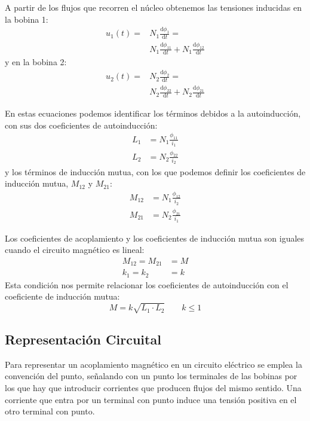 A partir de los flujos que recorren el núcleo obtenemos las tensiones inducidas en la bobina 1:
\begin{align*}
  u_1(t) = &N_1 \frac{\mathrm{d}\phi_1}{\mathrm{d}t} = \\
  &N_1 \frac{\mathrm{d}\phi_{11}}{\mathrm{d}t} + N_1 \frac{\mathrm{d}\phi_{12}}{\mathrm{d}t}
\end{align*}
y en la bobina 2:
\begin{align*}
  u_2(t) = &N_2 \frac{\mathrm{d}\phi_2}{\mathrm{d}t} = \\
  &N_2 \frac{\mathrm{d}\phi_{22}}{\mathrm{d}t} + N_2 \frac{\mathrm{d}\phi_{21}}{\mathrm{d}t}
\end{align*}

En estas ecuaciones podemos identificar los términos debidos a la autoinducción, con sus dos coeficientes de autoinducción:
\begin{align}
  \label{eq:acoplamiento-autoinduccion}
  L_1 &= N_1 \frac{\phi_{11}}{i_1}\\
  L_2 &= N_2 \frac{\phi_{22}}{i_2}
\end{align}
y los términos de inducción mutua, con los que podemos definir los coeficientes de inducción mutua, $M_{12}$ y $M_{21}$:
\begin{align}
  \label{eq:coef-induccion-mutua}
  M_{12} &= N_1 \frac{\phi_{12}}{i_2}\\
  M_{21} &= N_2 \frac{\phi_{21}}{i_1}
\end{align}

Los coeficientes de acoplamiento y los coeficientes de inducción mutua son iguales cuando el circuito magnético es lineal:
  \begin{align*}
  M_{12} = M_{21} &= M\\
  k_1 = k_2 &= k    
  \end{align*}
  Esta condición nos permite relacionar los coeficientes de autoinducción con el coeficiente de inducción mutua:
  \begin{equation}
    \label{eq:L-M}
    \boxed{M = k \sqrt{L_1 \cdot L_2}} \qquad  k \leq 1
  \end{equation}

  \subsection{Representación Circuital}
  Para representar un acoplamiento magnético en un circuito eléctrico
  se emplea la convención del punto, señalando con un punto los
  terminales de las bobinas por los que hay que introducir corrientes
  que producen flujos del mismo sentido. Una corriente que entra por
  un terminal con punto induce una tensión positiva en el otro
  terminal con punto.

